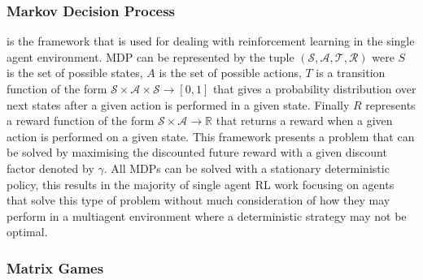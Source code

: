 \documentclass{article}
\begin{document}
\subsubsection{Markov Decision Process} is the framework that is used for dealing with reinforcement
learning in the single agent environment. MDP can be represented by the tuple 
$(\mathcal{S}, \mathcal{A}, \mathcal{T}, \mathcal{R})$ were $S$ is the set of possible
states, $A$ is the set of possible actions, $T$ is a transition function of the form 
$\mathcal{S}\times\mathcal{A}\times\mathcal{S}\rightarrow [0,1]$ that gives a probability
distribution over next states after a given action is performed in a given state. Finally
$R$ represents a reward function of the form $\mathcal{S}\times\mathcal{A}\rightarrow \mathbb{R}$
that returns a reward when a given action is performed on a given state. This framework presents a problem that can be solved by maximising the discounted
future reward with a given discount factor denoted by $\gamma$. All MDPs can be solved
with a stationary deterministic policy, this results in the majority of single agent
RL work focusing on agents that solve this type of problem without much consideration
of how they may perform in a multiagent environment where a deterministic strategy may
not be optimal.

\subsubsection{Matrix Games}
\end{document}
